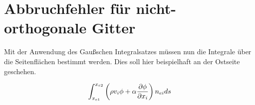 






\section{Abbruchfehler für nicht-orthogonale Gitter}

Mit der Anwendung des Gaußschen Integralsatzes müssen nun die Integrale über
die Seitenflächen bestimmt werden. Dies soll hier beispielhaft an der Ostseite geschehen.

\begin{equation}
  \int_{x_{e1}}^{x_{e2}}\left({\rho v_i\phi+\alpha \pder[\phi]{x_i}}\right)n_{ei}ds
  \label{eq:int_trans}
\end{equation}

